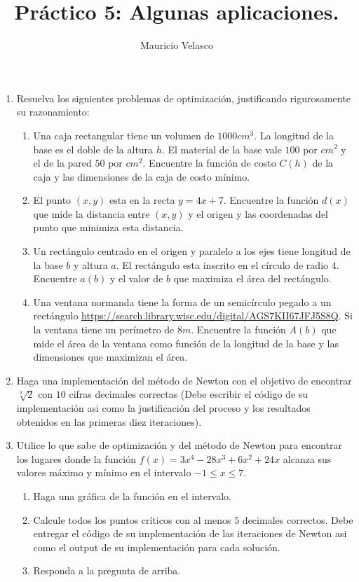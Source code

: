\documentclass[12pt, a4paper]{article}
\date{}
\begin{document}
\title{Pr\'actico 5: Algunas aplicaciones.}
\author{Mauricio Velasco}
\maketitle{}
\begin{enumerate}
\item Resuelva los siguientes problemas de optimización, justificando rigurosamente su razonamiento: 

\begin{enumerate}
\item Una caja rectangular tiene un volumen de $1000cm^3$. La longitud de la base es el doble de la altura $h$. El material de la base vale $100$ por $cm^2$ y el de la pared $50$ por $cm^2$. Encuentre la función de costo $C(h)$ de la caja y las dimensiones de la caja de costo mínimo.
\item El punto $(x,y)$ esta en la recta $y=4x+7$. Encuentre la función $d(x)$ que mide la distancia entre $(x,y)$ y el origen y las coordenadas del punto que minimiza esta distancia.

\item Un rectángulo centrado en el origen y paralelo a los ejes tiene longitud de la base $b$ y altura $a$. El rectángulo esta inscrito en el círculo de radio $4$. Encuentre $a(b)$ y el valor de $b$ que maximiza el área del rectángulo.


\item Una ventana normanda tiene la forma de un semicírculo pegado a un rectángulo \url{https://search.library.wisc.edu/digital/AGS7KII67JFJ5S8Q}. Si la ventana tiene un perímetro de $8m$. Encuentre la función $A(b)$ que mide el área de la ventana como función de la longitud de la base y las dimensiones que maximizan el área.

\end{enumerate}

\item Haga una implementación del método de Newton con el objetivo de encontrar $\sqrt[3]{2}$ con $10$ cifras decimales correctas (Debe escribir el código de su implementación asi como la justificación del proceso y los resultados obtenidos en las primeras diez iteraciones).


\item Utilice lo que sabe de optimización y del método de Newton para encontrar los lugares donde la función $f(x)=3x^4-28x^3+6x^2+24x$ alcanza sus valores máximo y mínimo en el intervalo $-1\leq x\leq 7$. 
\begin{enumerate}
\item Haga una gráfica de la función en el intervalo.
\item Calcule todos los puntos críticos con al menos $5$ decimales correctos. Debe entregar el código de su implementación de las iteraciones de Newton asi como el output de su implementación para cada solución.
\item Responda a la pregunta de arriba.


\end{enumerate}
\end{enumerate}
\end{document}
